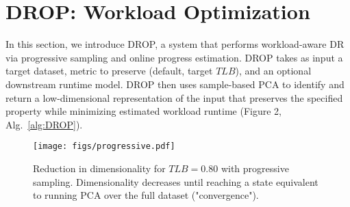 \section{DROP: Workload Optimization}
\label{sec:algo}

In this section, we introduce DROP, a system that performs workload-aware DR via progressive sampling and online progress estimation.
DROP takes as input a target dataset, metric to preserve (default, target $TLB$), and an optional downstream runtime model.
DROP then uses sample-based PCA to identify and return a low-dimensional representation of the input that preserves the specified property while minimizing estimated workload runtime (Figure 2, Alg.~\ref{alg:DROP}).


\begin{comment}
Notation used is in Table~\ref{table:inputs}.

\begin{table}
\centering
\small
\caption{\label{table:inputs} 
 DROP algorithm notation and defaults}
{\renewcommand{\arraystretch}{1.2}
\begin{tabular}{|c|l l|}
\hline 
Symbol & Description (\emph{Default}) & Type\tabularnewline
\hline
$X$  & Input dataset                          & $\mathbb{R}^{\mvar \times \dvar}$ \tabularnewline
$\mvar$  & Number of input data points            & $\mathbb{Z}_{+}$\tabularnewline
$\dvar$  & Input data dimension                   & $\mathbb{Z}_{+}$ \tabularnewline
$B$  & Target $TLB$ preservation      		 & $0 < \mathbb{R} \leq 1 $ \tabularnewline
$\mathcal{C}_\mvar(\dvar)$  & Downstream runtime function (\textit{k-NN runtime})       & $\mathbb{Z}_{+} \to \mathbb{R}_{+}$\tabularnewline
$R$  & Total DROP runtime       & $\mathbb{R}_{+}$ \tabularnewline
$c$ & Confidence level for $TLB$ preservation (\textit{$95 \%$})          & $\mathbb{R}$  \tabularnewline
$T_k$  & DROP output $k$-dimensional transformation &$\mathbb{R}^{\dvar \times k}$ \tabularnewline
$i $ & Current DROP iteration        & $\mathbb{Z}_+$  \tabularnewline

\hline 
\end{tabular}
}
\end{table}
\end{comment}

\begin{figure}
\texttt{[image: figs/progressive.pdf]}
\caption[]{ Reduction in dimensionality for  $TLB = 0.80$ with progressive sampling. Dimensionality decreases until reaching a state equivalent to running PCA over the full dataset ("convergence").}
\label{fig:progressive}
\end{figure}

